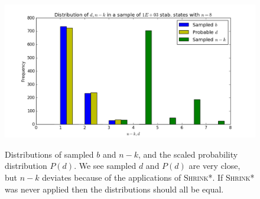 \documentclass[11pt]{article}
\begin{document}
\begin{figure}[h]
   \centering
    \includegraphics[width=.9\textwidth]{mar14-figs/d_n-k.png} \\
    \caption{Distributions of sampled $b$ and $n-k$, and the scaled probability distribution $P(d)$. We see sampled $d$ and $P(d)$ are very close, but $n-k$ deviates because of the applications of \textsc{Shrink*}. If \textsc{Shrink*} was never applied then the distributions should all be equal.}
\end{figure}
\end{document}
